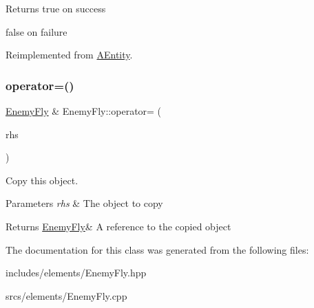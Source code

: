\begin{DoxyReturn}{Returns}
true on success 

false on failure 
\end{DoxyReturn}


Reimplemented from \hyperlink{class_a_entity_a450361b684fa02e4ffe0ba406b8e3b30}{A\+Entity}.

\mbox{\label{class_enemy_fly_a396255e79ad4f8419c20d1cc318499d5}} 
\subsubsection{\texorpdfstring{operator=()}{operator=()}}
{\footnotesize\ttfamily \hyperlink{class_enemy_fly}{Enemy\+Fly} \& Enemy\+Fly\+::operator= (\begin{DoxyParamCaption}\item[{\hyperlink{class_enemy_fly}{Enemy\+Fly} const \&}]{rhs }\end{DoxyParamCaption})}



Copy this object. 


\begin{DoxyParams}{Parameters}
{\em rhs} & The object to copy \\
\hline
\end{DoxyParams}
\begin{DoxyReturn}{Returns}
\hyperlink{class_enemy_fly}{Enemy\+Fly}\& A reference to the copied object 
\end{DoxyReturn}


The documentation for this class was generated from the following files\+:\begin{DoxyCompactItemize}
\item 
includes/elements/Enemy\+Fly.\+hpp\item 
srcs/elements/Enemy\+Fly.\+cpp\end{DoxyCompactItemize}
